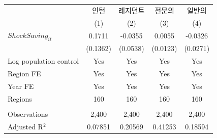 \begingroup
\centering
\begin{tabular}{lcccc}
   \toprule
                          & 인턴     & 레지던트 & 전문의   & 일반의 \\   
                          & (1)      & (2)      & (3)      & (4)\\  
   \midrule 
   $ShockSaving_{it}$     & 0.1711   & -0.0355  & 0.0055   & -0.0326\\   
                          & (0.1362) & (0.0538) & (0.0123) & (0.0271)\\   
   Log population control & Yes      & Yes      & Yes      & Yes\\  
   Region FE              & Yes      & Yes      & Yes      & Yes\\  
   Year FE                & Yes      & Yes      & Yes      & Yes\\  
   Regions                & 160      & 160      & 160      & 160\\  
    \\
   Observations           & 2,400    & 2,400    & 2,400    & 2,400\\  
   Adjusted R$^2$         & 0.07851  & 0.20569  & 0.41253  & 0.18594\\  
   \bottomrule
\end{tabular}
\par\endgroup
